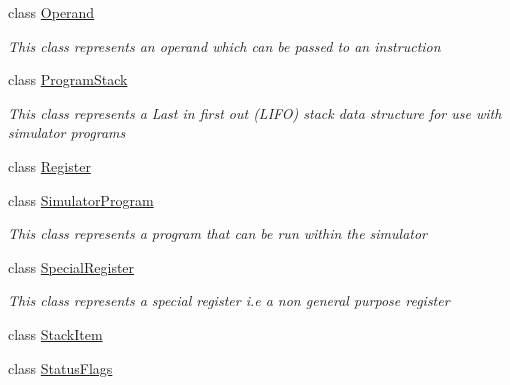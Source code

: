 \begin{DoxyCompactItemize}
class \hyperlink{class_c_p_u___o_s___simulator_1_1_c_p_u_1_1_operand}{Operand}
\begin{DoxyCompactList}\small\item\em This class represents an operand which can be passed to an instruction \end{DoxyCompactList}\item 
class \hyperlink{class_c_p_u___o_s___simulator_1_1_c_p_u_1_1_program_stack}{Program\+Stack}
\begin{DoxyCompactList}\small\item\em This class represents a Last in first out (L\+I\+F\+O) stack data structure for use with simulator programs \end{DoxyCompactList}\item 
class \hyperlink{class_c_p_u___o_s___simulator_1_1_c_p_u_1_1_register}{Register}
\item 
class \hyperlink{class_c_p_u___o_s___simulator_1_1_c_p_u_1_1_simulator_program}{Simulator\+Program}
\begin{DoxyCompactList}\small\item\em This class represents a program that can be run within the simulator \end{DoxyCompactList}\item 
class \hyperlink{class_c_p_u___o_s___simulator_1_1_c_p_u_1_1_special_register}{Special\+Register}
\begin{DoxyCompactList}\small\item\em This class represents a special register i.\+e a non general purpose register \end{DoxyCompactList}\item 
class \hyperlink{class_c_p_u___o_s___simulator_1_1_c_p_u_1_1_stack_item}{Stack\+Item}
\item 
class \hyperlink{class_c_p_u___o_s___simulator_1_1_c_p_u_1_1_status_flags}{Status\+Flags}
\end{DoxyCompactItemize}
